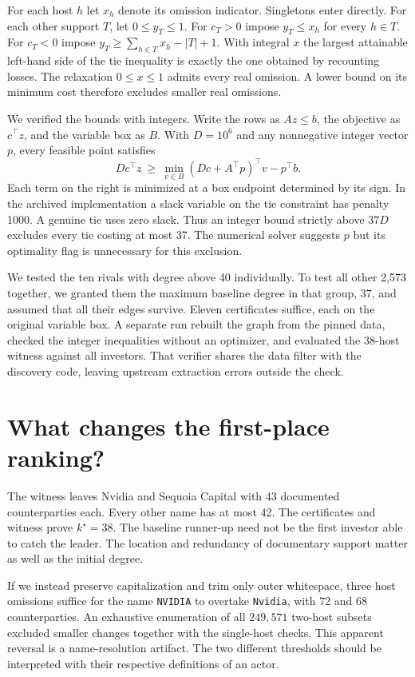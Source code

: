\documentclass[11pt]{article}
\begin{document}
\newpage
For each host $h$ let $x_h$ denote its omission indicator. Singletons enter directly. For each other support $T$, let $0\le y_T\le1$. For $c_T>0$ impose $y_T\le x_h$ for every $h\in T$. For $c_T<0$ impose $y_T\ge\sum_{h\in T}x_h-|T|+1$. With integral $x$ the largest attainable left-hand side of the tie inequality is exactly the one obtained by recounting losses. The relaxation $0\le x\le1$ admits every real omission. A lower bound on its minimum cost therefore excludes smaller real omissions.

We verified the bounds with integers. Write the rows as $Az\le b$, the objective as $c^\top z$, and the variable box as $B$. With $D=10^6$ and any nonnegative integer vector $p$, every feasible point satisfies
\[
 D c^\top z\ \ge\ \min_{v\in B}(D c+A^\top p)^\top v-p^\top b.
\]
Each term on the right is minimized at a box endpoint determined by its sign. In the archived implementation a slack variable on the tie constraint has penalty 1000. A genuine tie uses zero slack. Thus an integer bound strictly above $37D$ excludes every tie costing at most 37. The numerical solver suggests $p$ but its optimality flag is unnecessary for this exclusion.

We tested the ten rivals with degree above 40 individually. To test all other 2,573 together, we granted them the maximum baseline degree in that group, 37, and assumed that all their edges survive. Eleven certificates suffice, each on the original variable box. A separate run rebuilt the graph from the pinned data, checked the integer inequalities without an optimizer, and evaluated the 38-host witness against all investors. That verifier shares the data filter with the discovery code, leaving upstream extraction errors outside the check.

\section{What changes the first-place ranking?}
The witness leaves Nvidia and Sequoia Capital with 43 documented counterparties each. Every other name has at most 42. The certificates and witness prove $k^\star=38$. The baseline runner-up need not be the first investor able to catch the leader. The location and redundancy of documentary support matter as well as the initial degree.

If we instead preserve capitalization and trim only outer whitespace, three host omissions suffice for the name \texttt{NVIDIA} to overtake \texttt{Nvidia}, with 72 and 68 counterparties. An exhaustive enumeration of all $249{,}571$ two-host subsets excluded smaller changes together with the single-host checks. This apparent reversal is a name-resolution artifact. The two different thresholds should be interpreted with their respective definitions of an actor.
\end{document}
